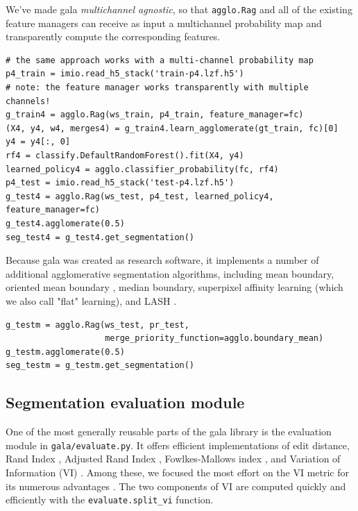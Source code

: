 \documentclass{frontiersSCNS} %
\begin{document}
We've made gala \emph{multichannel agnostic}, so that \texttt{\small agglo.Rag} and all of the existing feature managers can receive as input a multichannel probability map and transparently compute the corresponding features.

{\small
\begin{verbatim}
# the same approach works with a multi-channel probability map
p4_train = imio.read_h5_stack('train-p4.lzf.h5')
# note: the feature manager works transparently with multiple channels!
g_train4 = agglo.Rag(ws_train, p4_train, feature_manager=fc)
(X4, y4, w4, merges4) = g_train4.learn_agglomerate(gt_train, fc)[0]
y4 = y4[:, 0]
rf4 = classify.DefaultRandomForest().fit(X4, y4)
learned_policy4 = agglo.classifier_probability(fc, rf4)
p4_test = imio.read_h5_stack('test-p4.lzf.h5')
g_test4 = agglo.Rag(ws_test, p4_test, learned_policy4, feature_manager=fc)
g_test4.agglomerate(0.5)
seg_test4 = g_test4.get_segmentation()
\end{verbatim}
}

Because gala was created as research software, it implements a number of additional agglomerative segmentation algorithms, including mean boundary, oriented mean boundary \citep{Arbelaez:jg}, median boundary, superpixel affinity learning \citep{Ren:2003jg} (which we also call "flat" learning), and LASH \citep{Jain:2011vr}.

{\small
\begin{verbatim}
g_testm = agglo.Rag(ws_test, pr_test,
                    merge_priority_function=agglo.boundary_mean)
g_testm.agglomerate(0.5)
seg_testm = g_testm.get_segmentation()
\end{verbatim}
}

\subsection{Segmentation evaluation module}

One of the most generally reusable parts of the gala library is the evaluation module in \texttt{\small gala/evaluate.py}.
It offers efficient implementations of edit distance, Rand Index \citep{Rand:1971uy}, Adjusted Rand Index \citep{Hubert:1985}, Fowlkes-Mallows index \citep{Fowlkes:1983wz}, and Variation of Information (VI) \citep{meila:2005}.
Among these, we focused the most effort on the VI metric for its numerous advantages \citep{meila:2005, NunezIglesias:2013cd}.
The two components of VI are computed quickly and efficiently with the \texttt{\small evaluate.split\_vi} function.
\end{document}
